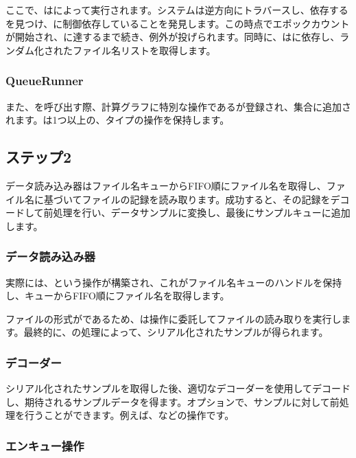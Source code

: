 \begin{content}
ここで、はによって実行されます。システムは逆方向にトラバースし、依存するを見つけ、に制御依存していることを発見します。この時点でエポックカウントが開始され、に達するまで続き、例外が投げられます。同時に、はに依存し、ランダム化されたファイル名リストを取得します。

\subsubsection{QueueRunner}

また、を呼び出す際、計算グラフに特別な操作であるが登録され、集合に追加されます。は1つ以上の、タイプの操作を保持します。

\subsection{ステップ2}

データ読み込み器はファイル名キューからFIFO順にファイル名を取得し、ファイル名に基づいてファイルの記録を読み取ります。成功すると、その記録をデコードして前処理を行い、データサンプルに変換し、最後にサンプルキューに追加します。

\subsubsection{データ読み込み器}

実際には、という操作が構築され、これがファイル名キューのハンドルを保持し、キューからFIFO順にファイル名を取得します。

ファイルの形式がであるため、は操作に委託してファイルの読み取りを実行します。最終的に、の処理によって、シリアル化されたサンプルが得られます。

\subsubsection{デコーダー}

シリアル化されたサンプルを取得した後、適切なデコーダーを使用してデコードし、期待されるサンプルデータを得ます。オプションで、サンプルに対して前処理を行うことができます。例えば、などの操作です。

\subsubsection{エンキュー操作}


\end{content}
